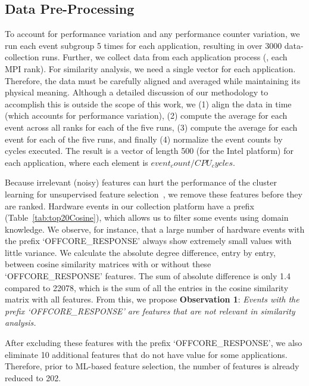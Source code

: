 \subsection{Data Pre-Processing}
\label{sec:prep}
To account for performance variation and any performance counter variation, we run each event subgroup 5 times for each application, resulting in over 3000 data-collection runs.  Further, we collect data from each application process (\ie, each MPI rank).  For similarity analysis, we need a single vector for each application.  Therefore, the data must be carefully aligned and averaged while maintaining its physical meaning.  Although a detailed discussion of our methodology to accomplish this is outside the scope of this work, we (1) align the data in time (which accounts for performance variation), (2) compute the average for each event across all ranks for each of the five runs, (3) compute the average for each event for each of the five runs, and finally (4) normalize the event counts by cycles executed. The result is a vector of length 500 (for the Intel platform) for each application, where each element is 
$event_count/CPU_cycles$.  

Because irrelevant (noisy) features can hurt the performance of the cluster learning for unsupervised feature selection~\cite{lindenbaum2021differentiable}, we  remove these features before they are ranked. %
Hardware events in our collection platform have a prefix (Table~\ref{tab:top20Cosine}), which allows us to filter some events using domain knowledge.
We observe, for instance, that a large number of hardware events with the prefix `OFFCORE\_RESPONSE' always show extremely small values with little variance. We calculate the absolute degree difference, entry by entry, between cosine similarity matrices with or without these `OFFCORE\_RESPONSE' features. The sum of absolute difference is only 1.4 compared to 22078, which is the sum of all the entries in the cosine similarity matrix with all features.  From this, we propose \textbf{Observation 1}: 
\textit{Events with the prefix `OFFCORE\_RESPONSE' are features that are not relevant in similarity analysis.} 

After excluding these features with the prefix `OFFCORE\_RESPONSE', we also eliminate 10 additional features that do not have value for some applications. Therefore, prior to ML-based feature selection, the number of features is already reduced to 202.

